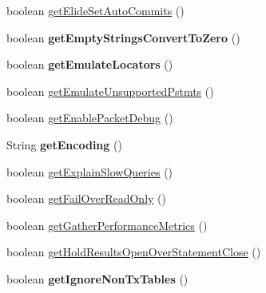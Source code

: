 \begin{DoxyCompactItemize}
boolean \mbox{\hyperlink{classcom_1_1mysql_1_1jdbc_1_1_connection_properties_impl_af85a865c522e1a674ab78c2bbfa2d738}{get\+Elide\+Set\+Auto\+Commits}} ()
\item 
\mbox{\label{classcom_1_1mysql_1_1jdbc_1_1_connection_properties_impl_a9f74077e481987d02963128ffd6bcce4}} 
boolean {\bfseries get\+Empty\+Strings\+Convert\+To\+Zero} ()
\item 
\mbox{\label{classcom_1_1mysql_1_1jdbc_1_1_connection_properties_impl_aa8639b8c997264f988365aaf7a69506b}} 
boolean {\bfseries get\+Emulate\+Locators} ()
\item 
boolean \mbox{\hyperlink{classcom_1_1mysql_1_1jdbc_1_1_connection_properties_impl_a20532164c4c808ec72758e2c9f6e96a7}{get\+Emulate\+Unsupported\+Pstmts}} ()
\item 
boolean \mbox{\hyperlink{classcom_1_1mysql_1_1jdbc_1_1_connection_properties_impl_aa19f3ea922a728eee3891e844fccadae}{get\+Enable\+Packet\+Debug}} ()
\item 
\mbox{\label{classcom_1_1mysql_1_1jdbc_1_1_connection_properties_impl_afef7f832e772a38a95a31f1cd1b96e19}} 
String {\bfseries get\+Encoding} ()
\item 
boolean \mbox{\hyperlink{classcom_1_1mysql_1_1jdbc_1_1_connection_properties_impl_aa03592149273154c28f81b184c3af796}{get\+Explain\+Slow\+Queries}} ()
\item 
boolean \mbox{\hyperlink{classcom_1_1mysql_1_1jdbc_1_1_connection_properties_impl_acc467008bf52946ef7c6b3d3d9b6f390}{get\+Fail\+Over\+Read\+Only}} ()
\item 
boolean \mbox{\hyperlink{classcom_1_1mysql_1_1jdbc_1_1_connection_properties_impl_a2e0086f3bd63c1bc9e7e6457ed41c996}{get\+Gather\+Performance\+Metrics}} ()
\item 
boolean \mbox{\hyperlink{classcom_1_1mysql_1_1jdbc_1_1_connection_properties_impl_a99c840bb883ead93ee8941a3a46b18fb}{get\+Hold\+Results\+Open\+Over\+Statement\+Close}} ()
\item 
\mbox{\label{classcom_1_1mysql_1_1jdbc_1_1_connection_properties_impl_af7f8892d48c5a3510dc0dba4ecb182bd}} 
boolean {\bfseries get\+Ignore\+Non\+Tx\+Tables} ()
\item 

\end{DoxyCompactItemize}
